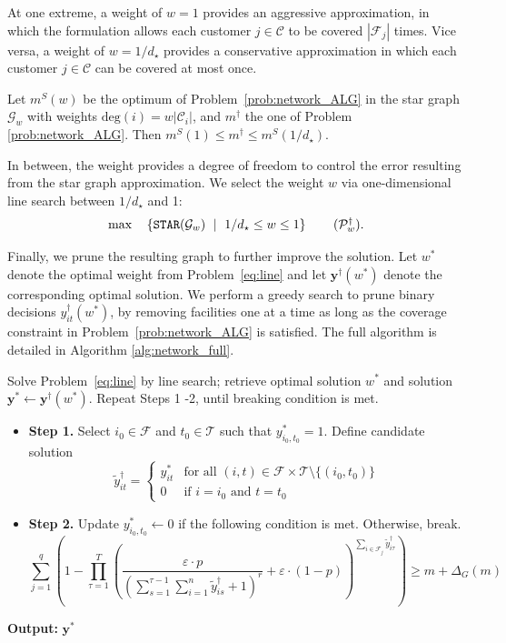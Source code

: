 \documentclass[nonblindrev]{informs3noheader}
\def\calC{\mathcal{C}}
\def\calF{\mathcal{F}}
\def\calG{\mathcal{G}}
\def\calP{\mathcal{P}}
\def\calT{\mathcal{T}}
\def\by{\boldsymbol{y}}
\begin{document}
At one extreme, a weight of $w=1$ provides an aggressive approximation, in which the formulation allows each customer $j\in\calC$ to be covered $|\calF_j|$ times. Vice versa, a weight of $w=1/d_\star$ provides a conservative approximation in which each customer $j\in\calC$ can be covered at most once. 
\begin{corollary}\label{cor:heuristic}
Let $m^S(w)$ be the optimum of Problem~\eqref{prob:network_ALG} in the star graph $\calG_w$ with weights $\text{deg}(i)=w|\calC_i|$, and $m^\dagger$ the one of Problem \eqref{prob:network_ALG}. Then $m^S(1) \leq m^\dagger \leq m^S(1/d_\star)$.
\end{corollary}

In between, the weight provides a degree of freedom to control the error resulting from the star graph approximation. We select the weight $w$ via one-dimensional line search between $1/d_\star$ and 1:
\begin{equation}\label{eq:line}
    \max\quad\left\{\texttt{STAR}(\calG_w)\ \mid\ 1/d_\star \leq w \leq 1\right\}\tag{$\calP_w^\dagger$}.
\end{equation}

Finally, we prune the resulting graph to further improve the solution. Let $w^*$ denote the optimal weight from Problem~\eqref{eq:line} and let $\by^\dagger(w^*)$ denote the corresponding optimal solution. We perform a greedy search to prune binary decisions $y_{it}^{\dagger}(w^*)$, by removing facilities one at a time as long as the coverage constraint in Problem~\eqref{prob:network_ALG} is satisfied. The full algorithm is detailed in Algorithm \ref{alg:network_full}. 

\begin{algorithm} [h!]
\caption{Algorithm to solve Problem~\eqref{prob:network_ALG} in a general graph $\calG$.}\small
\label{alg:network_full}
\begin{algorithmic}
\State Solve Problem~\eqref{eq:line} by line search; retrieve optimal solution $w^*$ and solution $\by^*\gets\by^\dagger(w^*)$.
\State Repeat Steps 1 -2, until breaking condition is met.
\begin{itemize}
    \item[] \textbf{Step 1.} Select $i_0\in\calF$ and $t_0\in\calT$ such that $y^*_{i_0,t_0}=1$. Define candidate solution
    $$\widetilde y_{it}^\dagger=\begin{cases}
        y_{it}^*&\text{for all $(i,t)\in\calF\times\calT\setminus\{(i_0,t_0)\}$}\\
        0&\text{if $i=i_0$ and $t=t_0$}
    \end{cases}$$
    \item[] \textbf{Step 2.} Update $y^*_{i_0,t_0}\gets0$ if the following condition is met. Otherwise, break.
    $$\sum_{j=1}^q \left(1-\prod_{\tau=1}^T \left(\frac{\varepsilon\cdot p}{\left(\sum_{s=1}^{\tau-1} \sum_{i=1}^n \widetilde y_{is}^\dagger +1\right)^r}+\varepsilon\cdot(1-p)\right)^{\sum_{i \in \calF_j} \widetilde y_{i\tau}^\dagger}\right) \geq m+\Delta_G(m)$$
\end{itemize}
\item \textbf{Output:} $\by^*$
\end{algorithmic}
\end{algorithm}
\end{document}
